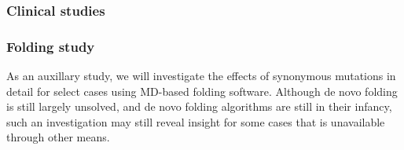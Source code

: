 \documentclass[11pt]{nih}
\begin{document}
\subsubsection{Clinical studies}

\subsubsection{Folding study}
As an auxillary study, we will investigate the effects of synonymous mutations in detail for select cases using MD-based folding software. Although de novo folding is still largely unsolved, and de novo folding algorithms are still in their infancy, such an investigation may still reveal insight for some cases that is unavailable through other means. \cite{Zhang:2008p3335}  




 

\appendix
\end{document}
